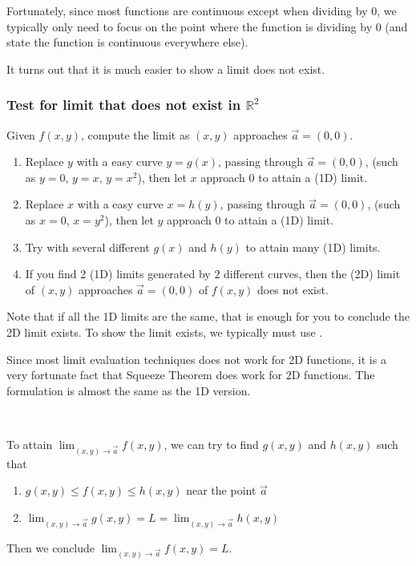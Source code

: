 \documentclass[11pt,fleqn]{book} %
\begin{document}
Fortunately, since most functions are continuous except when dividing by $0$, we typically only need to focus on the point where the function is dividing by $0$ (and state the function is continuous everywhere else).

It turns out that it is much easier to show a limit does not exist.

\subsubsection{Test for limit that does not exist in $\mathbb{R}^2$}

Given $f(x, y)$, compute the limit as $(x, y)$ approaches $\vec{a} = (0, 0)$.

\begin{enumerate}
    \item Replace $y$ with a easy curve $y = g(x)$, passing through $\vec{a} = (0, 0)$, (such as $y = 0$, $y = x$, $y = x^2$), then let $x$ approach $0$ to attain a (1D) limit.
    \item Replace $x$ with a easy curve $x = h(y)$, passing through $\vec{a} = (0, 0)$, (such as $x = 0$, $x = y^2$), then let $y$ approach $0$ to attain a (1D) limit.
    \item Try with several different $g(x)$ and $h(y)$ to attain many (1D) limits.
    \item If you find 2  (1D) limits generated by 2 different curves, then the (2D) limit of $(x, y)$ approaches $\vec{a} = (0, 0)$ of $f(x, y)$ does not exist.
\end{enumerate}

Note that if all the 1D limits are the same, that is  enough for you to conclude the 2D limit exists. To show the limit exists, we typically must use .

Since most limit evaluation techniques does not work for 2D functions, it is a very fortunate fact that Squeeze Theorem does work for 2D functions. The formulation is almost the same as the 1D version.

\begin{theorem}
    {~~~}

    To attain $\lim_{(x, y) \to \vec{a}} f(x, y)$, we can try to find $g(x, y)$ and $h(x, y)$ such that

    \begin{enumerate}
        \item $g(x, y) \le f(x, y) \le h(x, y)$ near the point $\vec{a}$
        \item $\lim_{(x, y) \to \vec{a}} g(x, y) = L = \lim_{(x, y) \to \vec{a}} h(x,y)$
    \end{enumerate}

    Then we conclude $\lim_{(x, y) \to \vec{a}} f(x, y) = L$.
\end{theorem}
\end{document}
